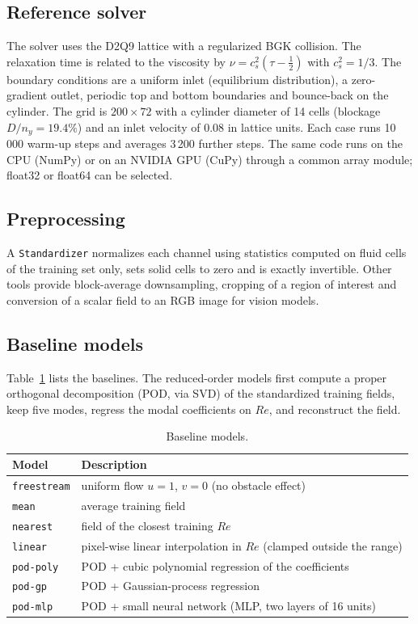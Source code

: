 \documentclass[11pt,a4paper]{article}
\begin{document}
\subsection{Reference solver}
The solver uses the D2Q9 lattice with a regularized BGK collision. The relaxation time is related to the viscosity by $\nu = c_s^2(\tau - \tfrac12)$ with $c_s^2 = 1/3$. The boundary conditions are a uniform inlet (equilibrium distribution), a zero-gradient outlet, periodic top and bottom boundaries and bounce-back on the cylinder. The grid is $200\times72$ with a cylinder diameter of 14 cells (blockage $D/n_y = 19.4\%$) and an inlet velocity of 0.08 in lattice units. Each case runs 10\,000 warm-up steps and averages 3\,200 further steps. The same code runs on the CPU (NumPy) or on an NVIDIA GPU (CuPy) through a common array module; float32 or float64 can be selected.

\subsection{Preprocessing}
A \texttt{Standardizer} normalizes each channel using statistics computed on fluid cells of the training set only, sets solid cells to zero and is exactly invertible. Other tools provide block-average downsampling, cropping of a region of interest and conversion of a scalar field to an RGB image for vision models.

\subsection{Baseline models}
Table~\ref{tab:models} lists the baselines. The reduced-order models first compute a proper orthogonal decomposition (POD, via SVD) of the standardized training fields, keep five modes, regress the modal coefficients on $Re$, and reconstruct the field.

\begin{table}[H]
\centering
\caption{Baseline models.}\label{tab:models}
\begin{tabular}{ll}
\toprule
Model & Description\\
\midrule
\texttt{freestream} & uniform flow $u=1$, $v=0$ (no obstacle effect)\\
\texttt{mean} & average training field\\
\texttt{nearest} & field of the closest training $Re$\\
\texttt{linear} & pixel-wise linear interpolation in $Re$ (clamped outside the range)\\
\texttt{pod-poly} & POD + cubic polynomial regression of the coefficients\\
\texttt{pod-gp} & POD + Gaussian-process regression\\
\texttt{pod-mlp} & POD + small neural network (MLP, two layers of 16 units)\\
\bottomrule
\end{tabular}
\end{table}
\end{document}
